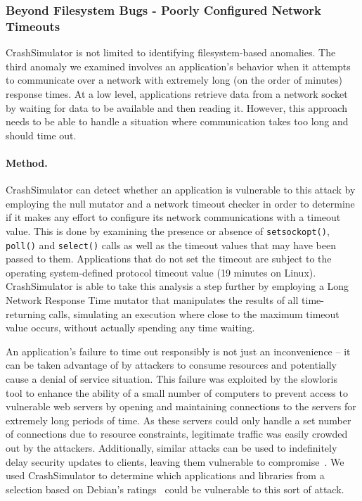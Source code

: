 \subsubsection{Beyond Filesystem Bugs - Poorly Configured Network Timeouts}
\label{sec-timeout-bugs}

CrashSimulator is not limited
to identifying filesystem-based anomalies.
The third anomaly we examined
involves an application's behavior
when it attempts to communicate
over a network with extremely long
(on the order of minutes) response times.
At a low level,
applications retrieve data from a network socket
by waiting for data to be available and then reading it.
However,
this approach needs to be able to handle
a situation where communication
takes too long and should time out.

\paragraph{Method.}
CrashSimulator can detect
whether an application is vulnerable to this attack
by employing the null mutator and a network timeout checker
in order to determine if it makes any effort
to configure its network communications with a timeout value.
This is done
by examining the presence or absence of {\tt setsockopt()}, {\tt poll()}
and {\tt select()} calls as well as the timeout values that may
have been passed to them. Applications that do not set the timeout are
subject to the operating system-defined protocol timeout value (19 minutes
on Linux).
CrashSimulator is able to take this analysis a step further by employing a
Long Network Response Time mutator
that manipulates
the results of all time-returning calls,
simulating an execution where close
to the maximum timeout value occurs,
without actually spending any time
waiting.

An application's failure
to time out responsibly
is not just an inconvenience --
it can be taken advantage of by attackers
to consume resources and potentially cause a denial of service situation.
This failure was exploited by the slowloris~\cite{Slowloris} tool
to enhance the ability
of a small number of computers to prevent access
to vulnerable web servers
by opening and maintaining connections to the servers
for extremely long periods of time.
As these servers could only handle a set number of connections
due to resource constraints,
legitimate traffic was easily crowded out by the attackers.
Additionally, similar attacks can be used to
indefinitely delay security updates to
clients, leaving them vulnerable to compromise~\cite{Cappos_TR_08}.
We used CrashSimulator to determine which applications and
libraries from a selection based on Debian's ratings~\cite{DebPopCon}
could be vulnerable to this sort of attack.


